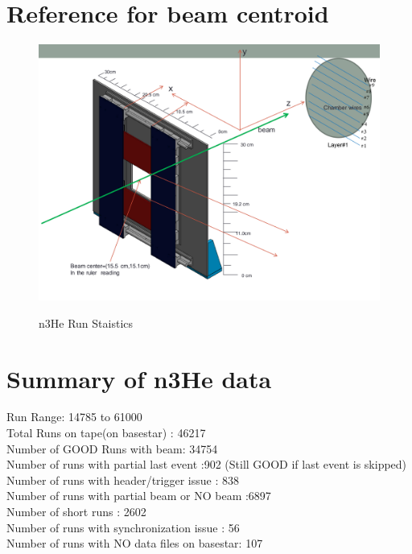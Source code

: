\documentclass[12pt]{article}
\begin{document}
\section{Reference for beam centroid}
\begin{figure}[htb]
\centering
\includegraphics[width=6.5in]{beam_centroid_ref_1.png}\\
\caption{n3He Run Staistics}\label{f5}
\end{figure}  


\newpage
\section{Summary of n3He data}
Run Range: 14785 to 61000 \\
Total Runs on tape(on basestar) : 46217 \\
Number of GOOD Runs with beam: 34754  \\
Number of runs with partial last event :902 (Still GOOD if last event is skipped)\\
Number of runs with header/trigger issue : 838 \\
Number of runs with partial beam or NO beam :6897 \\
Number of short runs : 2602 \\
Number of runs with synchronization issue : 56 \\
Number of runs with NO data files on basestar: 107 \\
\end{document}
